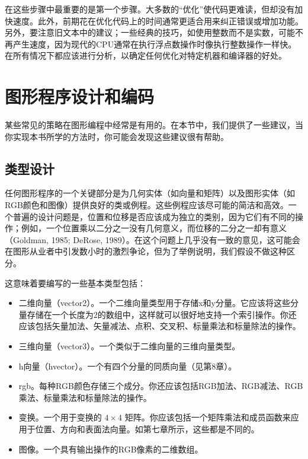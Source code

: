\documentclass[lang=cn,12pt]{elegantbook}
\begin{document}
在这些步骤中最重要的是第一个步骤。大多数的“优化”使代码更难读，但却没有加快速度。此外，前期花在优化代码上的时间通常更适合用来纠正错误或增加功能。另外，要注意旧文本中的建议；一些经典的技巧，如使用整数而不是实数，可能不再产生速度，因为现代的CPU通常在执行浮点数操作时像执行整数操作一样快。在所有情况下都应该进行分析，以确定任何优化对特定机器和编译器的好处。

\section{图形程序设计和编码}

某些常见的策略在图形编程中经常是有用的。在本节中，我们提供了一些建议，当你实现本书所学的方法时，你可能会发现这些建议很有帮助。

\subsection{类型设计}

任何图形程序的一个关键部分是为几何实体（如向量和矩阵）以及图形实体（如RGB颜色和图像）提供良好的类或例程。这些例程应该尽可能的简洁和高效。一个普遍的设计问题是，位置和位移是否应该成为独立的类别，因为它们有不同的操作；例如，一个位置乘以二分之一没有几何意义，而位移的二分之一却有意义（Goldman, 1985; DeRose, 1989）。在这个问题上几乎没有一致的意见，这可能会在图形从业者中引发数小时的激烈争论，但为了举例说明，我们假设不做这种区分。



这意味着要编写的一些基本类型包括：

\begin{itemize}
  \item 二维向量（vector2）。一个二维向量类型用于存储x和y分量。它应该将这些分量存储在一个长度为2的数组中，这样就可以很好地支持一个索引操作。你还应该包括矢量加法、矢量减法、点积、交叉积、标量乘法和标量除法的操作。
  \item 三维向量（vector3）。一个类似于二维向量的三维向量类型。
  \item h向量（hvector）。一个有四个分量的同质向量（见第8章）。
  \item rgb。每种RGB颜色存储三个成分。你还应该包括RGB加法、RGB减法、RGB乘法、标量乘法和标量除法的操作。
  \item 变换。一个用于变换的 $4 \times 4$ 矩阵。你应该包括一个矩阵乘法和成员函数来应用于位置、方向和表面法向量。如第七章所示，这些都是不同的。
  \item 图像。一个具有输出操作的RGB像素的二维数组。
\end{itemize}
\end{document}
